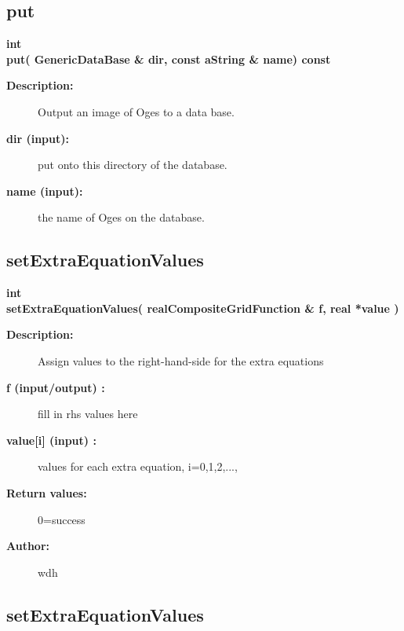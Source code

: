 \subsection{put}
 
\begin{flushleft} \textbf{%
int  \\ 
\settowidth{\OgesIncludeArgIndent}{put(}%
put( GenericDataBase \& dir, const aString \& name) const   
}\end{flushleft}
\begin{description}
\item[{\bf Description:}] 
   Output an image of Oges to a data base. 
\item[{\bf dir (input):}]  put onto this directory of the database.
\item[{\bf name (input):}]  the name of Oges on the database.
\end{description}
\subsection{setExtraEquationValues}
 
\begin{flushleft} \textbf{%
int  \\ 
\settowidth{\OgesIncludeArgIndent}{setExtraEquationValues(}%
setExtraEquationValues( realCompositeGridFunction \& f, real *value )
}\end{flushleft}
\begin{description}
\item[{\bf Description:}] 
   Assign values to the right-hand-side for the extra equations

\item[{\bf f (input/output) :}]  fill in rhs values here
\item[{\bf value[i] (input) :}]  values for each extra equation, i=0,1,2,...,
 
\item[{\bf Return values:}]  0=success
\item[{\bf Author:}]  wdh
\end{description}
\subsection{setExtraEquationValues}
 
